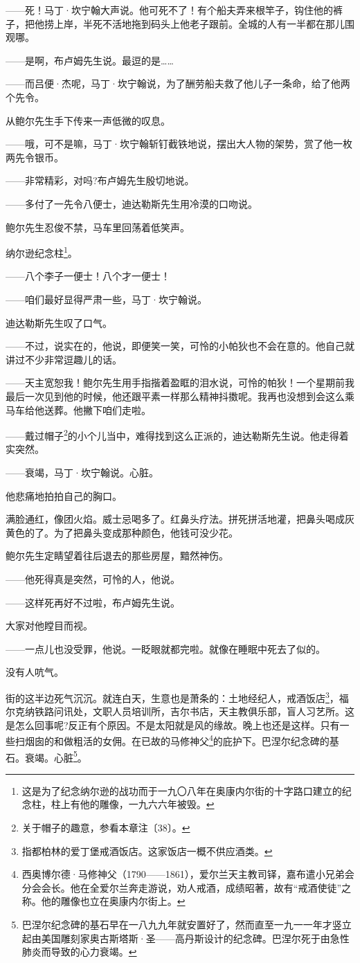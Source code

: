 \par ——死！马丁·坎宁翰大声说。他可死不了！有个船夫弄来根竿子，钩住他的裤子，把他捞上岸，半死不活地拖到码头上他老子跟前。全城的人有一半都在那儿围观哪。
\par ——是啊，布卢姆先生说。最逗的是……
\par ——而吕便·杰呢，马丁·坎宁翰说，为了酬劳船夫救了他儿子一条命，给了他两个先令。
\par 从鲍尔先生手下传来一声低微的叹息。
\par ——哦，可不是嘛，马丁·坎宁翰斩钉截铁地说，摆出大人物的架势，赏了他一枚两先令银币。
\par ——非常精彩，对吗?布卢姆先生殷切地说。
\par ——多付了一先令八便士，迪达勒斯先生用冷漠的口吻说。
\par 鲍尔先生忍俊不禁，马车里回荡着低笑声。
\par 纳尔逊纪念柱\footnote{这是为了纪念纳尔逊的战功而于一九〇八年在奥康内尔街的十字路口建立的纪念柱，柱上有他的雕像，一九六六年被毁。}。
\par ——八个李子一便士！八个才一便士！
\par ——咱们最好显得严肃一些，马丁·坎宁翰说。
\par 迪达勒斯先生叹了口气。
\par ——不过，说实在的，他说，即便笑一笑，可怜的小帕狄也不会在意的。他自己就讲过不少非常逗趣儿的话。
\par ——天主宽恕我！鲍尔先生用手指揩着盈眶的泪水说，可怜的帕狄！一个星期前我最后一次见到他的时候，他还跟平素一样那么精神抖擞呢。我再也没想到会这么乘马车给他送葬。他撇下咱们走啦。
\par ——戴过帽子\footnote{关于帽子的趣意，参看本章注〔38〕。}的小个儿当中，难得找到这么正派的，迪达勒斯先生说。他走得着实突然。
\par ——衰竭，马丁·坎宁翰说。心脏。
\par 他悲痛地拍拍自己的胸口。
\par 满脸通红，像团火焰。威士忌喝多了。红鼻头疗法。拼死拼活地灌，把鼻头喝成灰黄色的了。为了把鼻头变成那种颜色，他钱可没少花。
\par 鲍尔先生定睛望着往后退去的那些房屋，黯然神伤。
\par ——他死得真是突然，可怜的人，他说。
\par ——这样死再好不过啦，布卢姆先生说。
\par 大家对他瞠目而视。
\par ——一点儿也没受罪，他说。一眨眼就都完啦。就像在睡眠中死去了似的。
\par 没有人吭气。
\par 街的这半边死气沉沉。就连白天，生意也是萧条的：土地经纪人，戒酒饭店\footnote{指都柏林的爱丁堡戒酒饭店。这家饭店一概不供应酒类。}，福尔克纳铁路问讯处，文职人员培训所，吉尔书店，天主教俱乐部，盲人习艺所。这是怎么回事呢?反正有个原因。不是太阳就是风的缘故。晚上也还是这样。只有一些扫烟囱的和做粗活的女佣。在已故的马修神父\footnote{西奥博尔德·马修神父（1790——1861），爱尔兰天主教司铎，嘉布遣小兄弟会分会会长。他在全爱尔兰奔走游说，劝人戒酒，成绩昭著，故有“戒酒使徒”之称。他的雕像也立在奥康内尔街上。}的庇护下。巴涅尔纪念碑的基石。衰竭。心脏\footnote{巴涅尔纪念碑的基石早在一八九九年就安置好了，然而直至一九一一年才竖立起由美国雕刻家奥古斯塔斯·圣——高丹斯设计的纪念碑。巴涅尔死于由急性肺炎而导致的心力衰竭。}。
